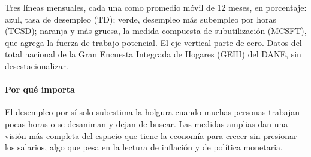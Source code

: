 \begin{leer}
Tres líneas mensuales, cada una como promedio móvil de 12 meses, en porcentaje: azul, tasa de desempleo (TD); verde, desempleo más subempleo por horas (TCSD); naranja y más gruesa, la medida compuesta de subutilización (MCSFT), que agrega la fuerza de trabajo potencial. El eje vertical parte de cero. Datos del total nacional de la Gran Encuesta Integrada de Hogares (GEIH) del DANE, sin desestacionalizar.
\end{leer}

\paragraph{Por qué importa}
El desempleo por sí solo subestima la holgura cuando muchas personas trabajan pocas horas o se desaniman y dejan de buscar. Las medidas amplias dan una visión más completa del espacio que tiene la economía para crecer sin presionar los salarios, algo que pesa en la lectura de inflación y de política monetaria.

